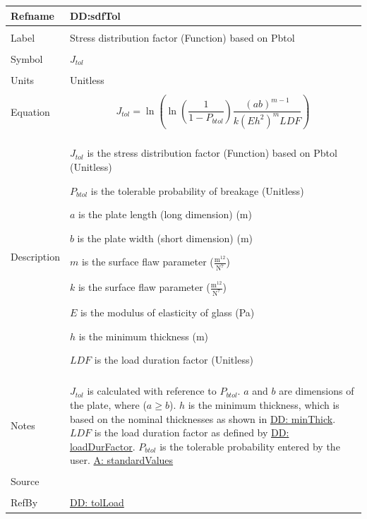 \documentclass[12pt]{article}
\begin{document}
\noindent \begin{minipage}{\textwidth}
\begin{tabular}{p{} p{}}
\toprule \textbf{Refname} & \textbf{DD:sdfTol}
\label{DD:sdfTol}
\\ \midrule \\
Label & Stress distribution factor (Function) based on Pbtol
\\ \midrule \\
Symbol & ${J_{tol}}$
\\ \midrule \\
Units & Unitless
\\ \midrule \\
Equation & \begin{displaymath}
           {J_{tol}}=\ln\left(\ln\left(\frac{1}{1-{P_{btol}}}\right) \frac{\left(a b\right)^{m-1}}{k \left(E h^{2}\right)^{m} LDF}\right)
           \end{displaymath}
\\ \midrule \\
Description & \begin{symbDescription}
              \item{${J_{tol}}$ is the stress distribution factor (Function) based on Pbtol (Unitless)}
              \item{${P_{btol}}$ is the tolerable probability of breakage (Unitless)}
              \item{$a$ is the plate length (long dimension) (m)}
              \item{$b$ is the plate width (short dimension) (m)}
              \item{$m$ is the surface flaw parameter ($\frac{\text{m}^{12}}{\text{N}^{7}}$)}
              \item{$k$ is the surface flaw parameter ($\frac{\text{m}^{12}}{\text{N}^{7}}$)}
              \item{$E$ is the modulus of elasticity of glass (Pa)}
              \item{$h$ is the minimum thickness (m)}
              \item{$LDF$ is the load duration factor (Unitless)}
              \end{symbDescription}
\\ \midrule \\
Notes & ${J_{tol}}$  is calculated with reference to  ${P_{btol}}$.
        $a$ and $b$ are dimensions of the plate, where ($a\geq{}b$).
        $h$ is the minimum thickness, which is based on the nominal thicknesses as shown in \hyperref[DD:minThick]{DD: minThick}.
        $LDF$ is the load duration factor as defined by \hyperref[DD:loadDurFactor]{DD: loadDurFactor}.
        ${P_{btol}}$ is the tolerable probability entered by the user.
        \hyperref[assumpSV]{A: standardValues}
\\ \midrule \\
Source & \cite{astm2009}
\\ \midrule \\
RefBy & \hyperref[DD:tolLoad]{DD: tolLoad}
\\ \bottomrule \end{tabular}
\end{minipage}
\end{document}
